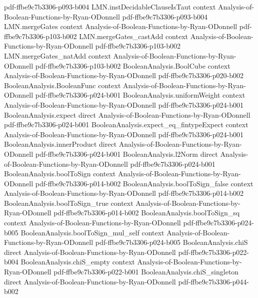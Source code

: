 \begin{theorem}
  {pdf-ffbe9c7b3306-p093-b004}
\proofstep
  {LMN.instDecidableClauseIsTaut}
  {context}
  {Analysis-of-Boolean-Functions-by-Ryan-ODonnell}
  {pdf-ffbe9c7b3306-p093-b004}
\proofstep
  {LMN.mergeGates}
  {context}
  {Analysis-of-Boolean-Functions-by-Ryan-ODonnell}
  {pdf-ffbe9c7b3306-p103-b002}
\proofstep
  {LMN.mergeGates_castAdd}
  {context}
  {Analysis-of-Boolean-Functions-by-Ryan-ODonnell}
  {pdf-ffbe9c7b3306-p103-b002}
\proofstep
  {LMN.mergeGates_natAdd}
  {context}
  {Analysis-of-Boolean-Functions-by-Ryan-ODonnell}
  {pdf-ffbe9c7b3306-p103-b002}
\proofstep
  {BooleanAnalysis.BoolCube}
  {context}
  {Analysis-of-Boolean-Functions-by-Ryan-ODonnell}
  {pdf-ffbe9c7b3306-p020-b002}
\proofstep
  {BooleanAnalysis.BooleanFunc}
  {context}
  {Analysis-of-Boolean-Functions-by-Ryan-ODonnell}
  {pdf-ffbe9c7b3306-p024-b001}
\proofstep
  {BooleanAnalysis.uniformWeight}
  {context}
  {Analysis-of-Boolean-Functions-by-Ryan-ODonnell}
  {pdf-ffbe9c7b3306-p024-b001}
\proofstep
  {BooleanAnalysis.expect}
  {direct}
  {Analysis-of-Boolean-Functions-by-Ryan-ODonnell}
  {pdf-ffbe9c7b3306-p024-b001}
\proofstep
  {BooleanAnalysis.expect_eq_fintypeExpect}
  {context}
  {Analysis-of-Boolean-Functions-by-Ryan-ODonnell}
  {pdf-ffbe9c7b3306-p024-b001}
\proofstep
  {BooleanAnalysis.innerProduct}
  {direct}
  {Analysis-of-Boolean-Functions-by-Ryan-ODonnell}
  {pdf-ffbe9c7b3306-p024-b001}
\proofstep
  {BooleanAnalysis.l2Norm}
  {direct}
  {Analysis-of-Boolean-Functions-by-Ryan-ODonnell}
  {pdf-ffbe9c7b3306-p024-b001}
\proofstep
  {BooleanAnalysis.boolToSign}
  {context}
  {Analysis-of-Boolean-Functions-by-Ryan-ODonnell}
  {pdf-ffbe9c7b3306-p014-b002}
\proofstep
  {BooleanAnalysis.boolToSign_false}
  {context}
  {Analysis-of-Boolean-Functions-by-Ryan-ODonnell}
  {pdf-ffbe9c7b3306-p014-b002}
\proofstep
  {BooleanAnalysis.boolToSign_true}
  {context}
  {Analysis-of-Boolean-Functions-by-Ryan-ODonnell}
  {pdf-ffbe9c7b3306-p014-b002}
\proofstep
  {BooleanAnalysis.boolToSign_sq}
  {context}
  {Analysis-of-Boolean-Functions-by-Ryan-ODonnell}
  {pdf-ffbe9c7b3306-p024-b005}
\proofstep
  {BooleanAnalysis.boolToSign_mul_self}
  {context}
  {Analysis-of-Boolean-Functions-by-Ryan-ODonnell}
  {pdf-ffbe9c7b3306-p024-b005}
\proofstep
  {BooleanAnalysis.chiS}
  {direct}
  {Analysis-of-Boolean-Functions-by-Ryan-ODonnell}
  {pdf-ffbe9c7b3306-p022-b004}
\proofstep
  {BooleanAnalysis.chiS_empty}
  {context}
  {Analysis-of-Boolean-Functions-by-Ryan-ODonnell}
  {pdf-ffbe9c7b3306-p022-b001}
\proofstep
  {BooleanAnalysis.chiS_singleton}
  {direct}
  {Analysis-of-Boolean-Functions-by-Ryan-ODonnell}
  {pdf-ffbe9c7b3306-p044-b002}

\end{theorem}
